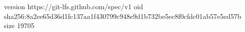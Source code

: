 version https://git-lfs.github.com/spec/v1
oid sha256:8a2ee65d36d1fc137aa1f430799c948e9d1b732be5ec8f0cfdc01ab57e5ed57b
size 19705
